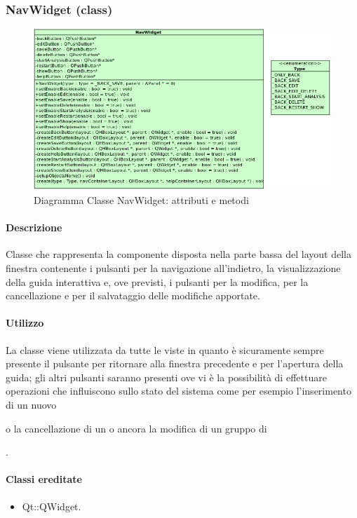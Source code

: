 \subsubsection{NavWidget (class)}
\label{spenav}
\begin{figure}[!h]
\centering
			\includegraphics[width=0.9\linewidth]{./Content/Immagini/view/NavWidget.png}
			\caption{Diagramma Classe NavWidget: attributi e metodi}
			\label{cl_nav}
\end{figure}
\paragraph{Descrizione \\}
Classe che rappresenta la componente disposta nella parte bassa del layout della finestra contenente i pulsanti per la navigazione all'indietro, la visualizzazione della guida interattiva e, ove previsti, i pulsanti per la modifica, per la cancellazione e per il salvataggio delle modifiche apportate.
\paragraph{Utilizzo\\}
La classe viene utilizzata da tutte le viste in quanto è sicuramente sempre presente il pulsante per ritornare alla finestra precedente e per l'apertura della guida; gli altri pulsanti saranno presenti ove vi è la possibilità di effettuare operazioni che influiscono sullo stato del sistema come per esempio l'inserimento di un nuovo \subject{} o la cancellazione di un \protocol{} o ancora la modifica di un gruppo di \subject{}.
\paragraph{Classi ereditate\\}
\begin{itemize}
\item Qt::QWidget.
\end{itemize}
